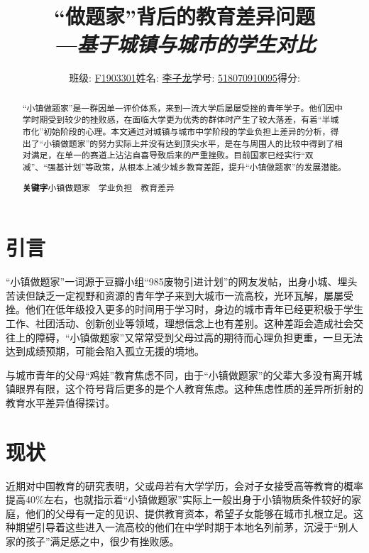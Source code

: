 \documentclass[10pt,a4paper,heading=false]{ctexart}
\begin{document}
    \title{\vspace{-3cm}“做题家”背后的教育差异问题
    \\\hspace*{15ex}\emph{\Large---基于城镇与城市的学生对比}
    }
    \author{\normalsize 班级: \underline{F1903301}\quad 姓名: \underline{李子龙}\quad 学号: \underline{518070910095}\quad 得分: \underline{\quad\quad\quad}}
    \date{}
    \maketitle
    \begin{abstract}
        “小镇做题家”是一群因单一评价体系，来到一流大学后屡屡受挫的青年学子。他们因中学时期受到较少的挫败感，在面临大学更为优秀的群体时产生了较大落差，有着“半城市化”初始阶段的心理。本文通过对城镇与城市中学阶段的学业负担上差异的分析，得出了“小镇做题家”的努力实际上并没有达到顶尖水平，是在与周围人的比较中得到了相对满足，在单一的赛道上沾沾自喜导致后来的严重挫败。目前国家已经实行“双减”、“强基计划”等政策，从根本上减少城乡教育差距，提升“小镇做题家”的发展潜能。

        \textbf{关键字}\quad 小镇做题家~~学业负担~~教育差异
    \end{abstract}
    \section{引言}
    “小镇做题家”一词源于豆瓣小组“985废物引进计划”的网友发帖，出身小城、埋头苦读但缺乏一定视野和资源的青年学子来到大城市一流高校，光环瓦解，屡屡受挫。\cite{solver}他们在低年级投入更多的时间用于学习时，身边的城市青年已经更积极于学生工作、社团活动、创新创业等领域，理想信念上也有差别。这种差距会造成社会交往上的障碍，“小镇做题家”又常常受到父母过高的期待而心理负担更重，一旦无法达到成绩预期，可能会陷入孤立无援的境地。\cite{solveranalysis}

    与城市青年的父母“鸡娃”教育焦虑不同，由于“小镇做题家”的父辈大多没有离开城镇眼界有限，这个符号背后更多的是个人教育焦虑。这种焦虑性质的差异所折射的教育水平差异值得探讨。
    \section{现状}
    近期对中国教育的研究表明，父或母若有大学学历，会对子女接受高等教育的概率提高40\%左右\cite{familyedu}，也就指示着“小镇做题家”实际上一般出身于小镇物质条件较好的家庭，他们的父母有一定的见识、提供教育资本，希望子女能够在城市扎根立足。这种期望引导着这些进入一流高校的他们在中学时期于本地名列前茅，沉浸于“别人家的孩子”满足感之中，很少有挫败感。
\end{document}
